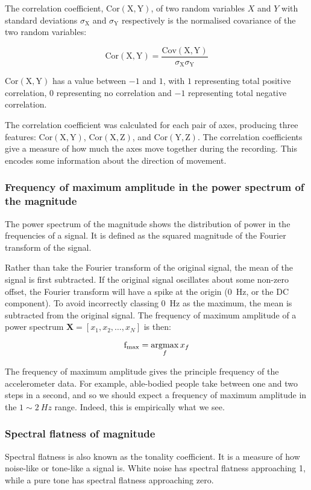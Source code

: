         The correlation coefficient, $\mathrm{Cor(X,Y)}$, of two random variables $X$ and $Y$ with standard deviations $\sigma_{\mathrm{X}}$ and $\sigma_{\mathrm{Y}}$ respectively is the normalised covariance of the two random variables: 
        
        $$\mathrm{Cor(X,Y)} = \frac{\mathrm{Cov(X,Y)}}{\sigma_{\mathrm{X}}\sigma_{\mathrm{Y}}}$$
        
        $\mathrm{Cor(X,Y)}$ has a value between $-1$ and $1$, with $1$ representing total positive correlation, $0$ representing no correlation and $-1$ representing total negative correlation.
         
        The correlation coefficient was calculated for each pair of axes, producing three features: $\mathrm{Cor(X,Y)}$, $\mathrm{Cor(X,Z)}$, and $\mathrm{Cor(Y,Z)}$. The correlation coefficients give a measure of how much the axes move together during the recording. This encodes some information about the direction of movement.
        
      \subsubsection{Frequency of maximum amplitude in the power spectrum of the magnitude}
        The power spectrum of the magnitude shows the distribution of power in the frequencies of a signal. It is defined as the squared magnitude of the Fourier transform of the signal.
        
        Rather than take the Fourier transform of the original signal, the mean of the signal is first subtracted. If the original signal oscillates about some non-zero offset, the Fourier transform will have a spike at the origin (0~\si{Hz}, or the DC component). To avoid incorrectly classing 0~\si{Hz} as the maximum, the mean is subtracted from the original signal. The frequency of maximum amplitude of a power spectrum $\mathbf{X} = [x_1, x_2, \dots , x_N]$ is then:
        
        $$\mathrm{f}_\mathrm{max} = \operatorname*{argmax}_f x_f$$
        
        The frequency of maximum amplitude gives the principle frequency of the accelerometer data. For example, able-bodied people take between one and two steps in a second, and so we should expect a frequency of maximum amplitude in the $1 \sim 2~\si{Hz}$ range. Indeed, this is empirically what we see.

      \subsubsection{Spectral flatness of magnitude}
        Spectral flatness is also known as the tonality coefficient. It is a measure of how noise-like or tone-like a signal is. White noise has spectral flatness approaching 1, while a pure tone has spectral flatness approaching zero.
        
